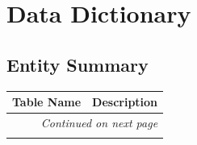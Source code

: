 \chapter{Data Dictionary}
\label{subsec:data_dictionary}

\section*{Entity Summary}
\label{subsubsec:entity_summary}

\begin{longtable}{|p{4.5cm}|p{9.5cm}|}
\hline
\textbf{Table Name} & \textbf{Description} \\ \hline
\endhead

\hline \multicolumn{2}{r}{\textit{Continued on next page}} \\ \hline
\endfoot

\hline
\endlastfoot


\end{longtable}

